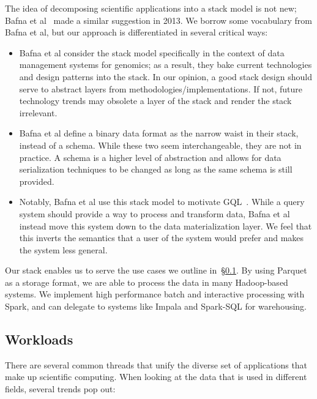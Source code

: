 \documentclass{acm_proc_article-sp}
\begin{document}
The idea of decomposing scientific applications into a stack model is not new; Bafna et al~\cite{bafna13}
made a similar suggestion in 2013. We borrow some vocabulary from Bafna et al, but our approach is
differentiated in several critical ways:

\begin{itemize}
\item Bafna et al consider the stack model specifically in the context of data management systems for
genomics; as a result, they bake current technologies and design patterns into the stack. In our opinion,
a good stack design should serve to abstract layers from methodologies/implementations. If not, future
technology trends may obsolete a layer of the stack and render the stack irrelevant.
\item Bafna et al define a binary data format as the narrow waist in their stack, instead of a schema.
While these two seem interchangeable, they are not in practice. A schema is a higher level of abstraction
and allows for data serialization techniques to be changed as long as the same schema is still provided.
\item Notably, Bafna et al use this stack model to motivate GQL~\cite{kozanitis14}. While a query system
should provide a way to process and transform data, Bafna et al instead move this system down to the
data materialization layer. We feel that this inverts the semantics that a user of the system would prefer
and makes the system less general.
\end{itemize}

Our stack enables us to serve the use cases we outline in~\S\ref{sec:workloads}. By using
Parquet as a storage format, we are able to process the data in many Hadoop-based systems. We
implement high performance batch and interactive processing with \linebreak Spark, and can delegate to systems
like Impala and Spark-SQL for warehousing.

\subsection{Workloads}
\label{sec:workloads}

There are several common threads that unify the diverse set of applications that make up scientific
computing. When looking at the data that is used in different fields, several trends pop out:
\end{document}
